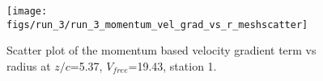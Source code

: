 \begin{figure}[H]
\centering
\texttt{[image: figs/run\_3/run\_3\_momentum\_vel\_grad\_vs\_r\_meshscatter]}
\caption{Scatter plot of the momentum based velocity gradient term vs radius at $z/c$=5.37, $V_{free}$=19.43, station 1.}
\label{fig:run_3_momentum_vel_grad_vs_r_meshscatter}
\end{figure}


